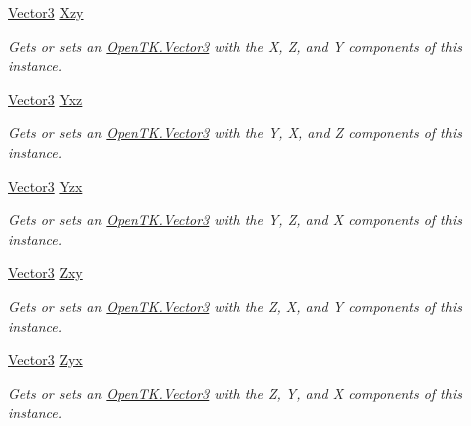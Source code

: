 \begin{DoxyCompactItemize}
\hyperlink{struct_open_t_k_1_1_vector3}{Vector3} \hyperlink{struct_open_t_k_1_1_vector3_a50a9ce0de3089c7d6d35b5d45771b71e}{Xzy}
\begin{DoxyCompactList}\small\item\em Gets or sets an \hyperlink{struct_open_t_k_1_1_vector3}{Open\-T\-K.\-Vector3} with the X, Z, and Y components of this instance. \end{DoxyCompactList}\item 
\hyperlink{struct_open_t_k_1_1_vector3}{Vector3} \hyperlink{struct_open_t_k_1_1_vector3_acb33168a5d62a5bf9c238de3004d18e5}{Yxz}
\begin{DoxyCompactList}\small\item\em Gets or sets an \hyperlink{struct_open_t_k_1_1_vector3}{Open\-T\-K.\-Vector3} with the Y, X, and Z components of this instance. \end{DoxyCompactList}\item 
\hyperlink{struct_open_t_k_1_1_vector3}{Vector3} \hyperlink{struct_open_t_k_1_1_vector3_a2d64eea73bdec2f85d1e9d3f678e4165}{Yzx}
\begin{DoxyCompactList}\small\item\em Gets or sets an \hyperlink{struct_open_t_k_1_1_vector3}{Open\-T\-K.\-Vector3} with the Y, Z, and X components of this instance. \end{DoxyCompactList}\item 
\hyperlink{struct_open_t_k_1_1_vector3}{Vector3} \hyperlink{struct_open_t_k_1_1_vector3_a9024fb2595a67c4f1ab7dc6b8e2dbb0e}{Zxy}
\begin{DoxyCompactList}\small\item\em Gets or sets an \hyperlink{struct_open_t_k_1_1_vector3}{Open\-T\-K.\-Vector3} with the Z, X, and Y components of this instance. \end{DoxyCompactList}\item 
\hyperlink{struct_open_t_k_1_1_vector3}{Vector3} \hyperlink{struct_open_t_k_1_1_vector3_a659b53e7c8b5f305b8b8f3faa8325b05}{Zyx}
\begin{DoxyCompactList}\small\item\em Gets or sets an \hyperlink{struct_open_t_k_1_1_vector3}{Open\-T\-K.\-Vector3} with the Z, Y, and X components of this instance. \end{DoxyCompactList}\end{DoxyCompactItemize}



